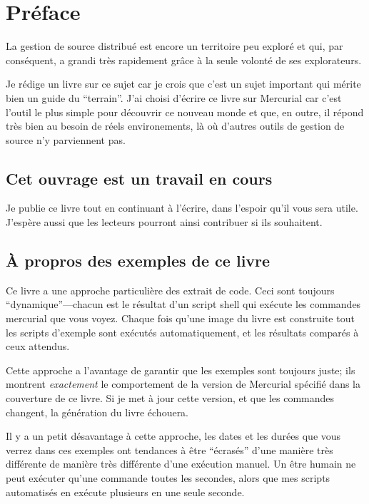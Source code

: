 \chapter*{Préface}
\label{chap:preface}

La gestion de source distribué est encore un territoire peu exploré
et qui, par conséquent, a grandi très rapidement grâce à la seule 
volonté de ses explorateurs.

Je rédige un livre sur ce sujet car je crois que c'est un sujet 
important qui mérite bien un guide du ``terrain''. J'ai choisi d'écrire
ce livre sur Mercurial car c'est l'outil le plus simple pour découvrir
ce nouveau monde et que, en outre, il répond très bien au besoin de
réels environements, là où d'autres outils de gestion de source n'y
parviennent pas.

\section{Cet ouvrage est un travail en cours}

Je publie ce livre tout en continuant à l'écrire, dans l'espoir qu'il
vous sera utile. J'espère aussi que les lecteurs pourront ainsi contribuer
si ils souhaitent.

\section{À propros des exemples de ce livre}

Ce livre a une approche particulière des extrait de code. Ceci sont 
toujours ``dynamique''---chacun est le résultat d'un script shell qui
exécute les commandes mercurial que vous voyez. Chaque fois qu'une 
image du livre est construite tout les scripts d'exemple sont exécutés
automatiquement, et les résultats comparés à ceux attendus.

Cette approche a l'avantage de garantir que les exemples sont toujours
juste; ils montrent \emph{exactement} le comportement de la version de
Mercurial spécifié dans la couverture de ce livre. Si je met à jour cette
version, et que les commandes changent, la génération du livre échouera.

Il y a un petit désavantage à cette approche, les dates et les
durées que vous verrez dans ces exemples ont tendances à être
``écrasés'' d'une manière très différente de manière très différente
d'une exécution manuel. Un être humain ne peut exécuter qu'une commande
toutes les secondes, alors que mes scripts automatisés en exécute
plusieurs en une seule seconde.

